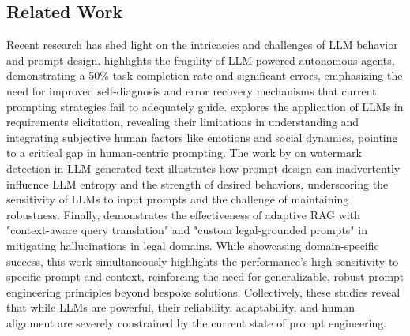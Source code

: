 \documentclass{article}
\newcommand{\citePone}{\cite{paper1}}
\newcommand{\citePtwo}{\cite{paper2}}
\newcommand{\citePthree}{\cite{paper3}}
\newcommand{\citePfive}{\cite{paper5}}
\begin{document}
\subsection{Related Work}
Recent research has shed light on the intricacies and challenges of LLM behavior and prompt design. \citePone{} highlights the fragility of LLM-powered autonomous agents, demonstrating a 50\% task completion rate and significant errors, emphasizing the need for improved self-diagnosis and error recovery mechanisms that current prompting strategies fail to adequately guide. \citePtwo{} explores the application of LLMs in requirements elicitation, revealing their limitations in understanding and integrating subjective human factors like emotions and social dynamics, pointing to a critical gap in human-centric prompting. The work by \citePthree{} on watermark detection in LLM-generated text illustrates how prompt design can inadvertently influence LLM entropy and the strength of desired behaviors, underscoring the sensitivity of LLMs to input prompts and the challenge of maintaining robustness. Finally, \citePfive{} demonstrates the effectiveness of adaptive RAG with "context-aware query translation" and "custom legal-grounded prompts" in mitigating hallucinations in legal domains. While showcasing domain-specific success, this work simultaneously highlights the performance's high sensitivity to specific prompt and context, reinforcing the need for generalizable, robust prompt engineering principles beyond bespoke solutions. Collectively, these studies reveal that while LLMs are powerful, their reliability, adaptability, and human alignment are severely constrained by the current state of prompt engineering.
\end{document}
